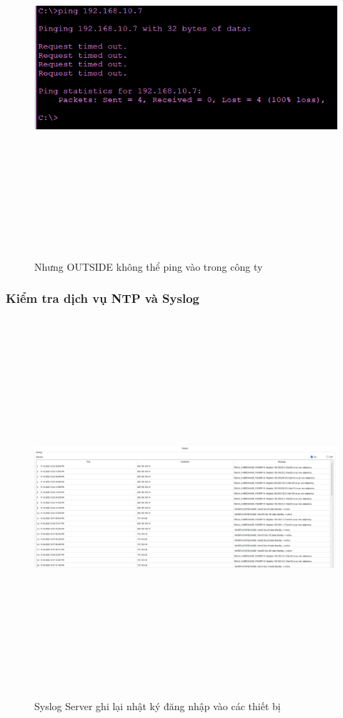 \documentclass[a4paper, 12pt]{article}
\begin{document}
\begin{figure}[H]
    \centering
    \includegraphics[width=16cm, height=14cm]{img/4.13.1h.png}
    \caption{Nhưng OUTSIDE không thể ping vào trong công ty}
    \label{hinh4131h}
\end{figure}

\subsubsection{Kiểm tra dịch vụ NTP và Syslog }
\begin{figure}[H]
    \centering
    \includegraphics[width=16cm, height=14cm]{img/4.13.1i.png}
    \caption{Syslog Server ghi lại nhật ký đăng nhập vào các thiết bị }
    \label{hinh4131i}
\end{figure}
\end{document}
